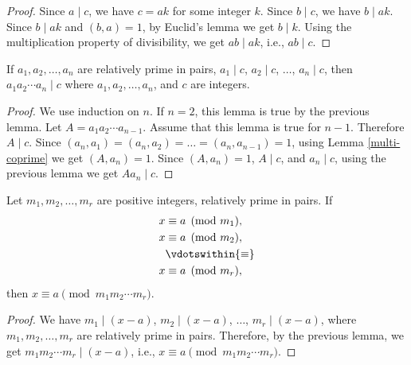 \begin{proof}
  Since \( a \mid c \), we have \( c = ak \) for some integer \( k \).
  Since \( b \mid c \), we have \( b \mid ak \). Since \( b \mid ak \)
  and \( (b, a) = 1 \), by Euclid's lemma we get \( b \mid k \). Using
  the multiplication property of divisibility, we get \( ab \mid ak
  \), i.e., \( ab \mid c \).
\end{proof}


\begin{lemma}
  If \( a_1, a_2, \dots, a_n \) are relatively prime in pairs, \( a_1
  \mid c \), \( a_2 \mid c \), \( \dots \), \( a_n \mid c \), then \(
  a_1 a_2 \cdots a_n \mid c \) where \( a_1, a_2, \dots, a_n \), and
  \( c \) are integers.
\end{lemma}

\begin{proof}
  We use induction on \( n \). If \( n = 2 \), this lemma is true by
  the previous lemma. Let \( A = a_1 a_2 \cdots a_{n-1} \). Assume
  that this lemma is true for \( n - 1 \). Therefore \( A \mid c \).
  Since \( (a_n, a_1) = (a_n, a_2) = \dots = (a_n, a_{n-1}) = 1 \),
  using Lemma \ref{multi-coprime} we get \( (A, a_n) = 1 \). Since \(
  (A, a_n) = 1 \), \( A \mid c \), and \( a_n \mid c \), using the
  previous lemma we get \( A a_n \mid c \).
\end{proof}


\begin{lemma}
  Let \( m_1, m_2, \dots, m_r \) are positive integers, relatively
  prime in pairs. If
  \begin{align*}
    x & \equiv a \pmod{m_1}, \\
    x & \equiv a \pmod{m_2}, \\
      & \vdotswithin{\equiv} \\
    x & \equiv a \pmod{m_r}, \\
  \end{align*}
  then \( x \equiv a \pmod{m_1 m_2 \cdots m_r} \).
\end{lemma}

\begin{proof}
  We have \( m_1 \mid (x - a) \), \( m_2 \mid (x - a) \), \( \dots \),
  \( m_r \mid (x - a) \), where \( m_1, m_2, \dots, m_r \) are
  relatively prime in pairs. Therefore, by the previous lemma, we get
  \( m_1 m_2 \cdots m_r \mid (x - a) \), i.e., \( x \equiv a \pmod{m_1
    m_2 \cdots m_r} \).
\end{proof}

  
